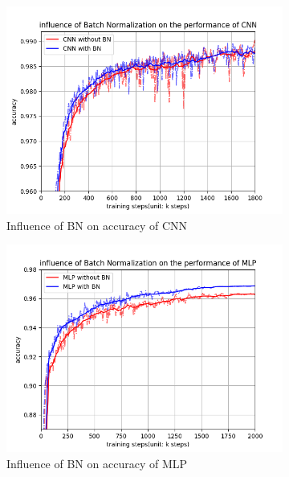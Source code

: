 \documentclass[12pt,letterpaper]{article}
\begin{document}
\begin{figure}[h]
    \begin{subfigure}{0.32\textwidth}
    \includegraphics[width=\linewidth]{CNN_BN_acc.png}
    \caption{\small Influence of BN on accuracy of CNN} \label{fig:a}
    \end{subfigure}\hspace*{\fill}
    \begin{subfigure}{0.32\textwidth}
    \includegraphics[width=\linewidth]{MLP_BN_acc.png}
    \caption{\small Influence of BN on accuracy of MLP} \label{fig:b}
    \end{subfigure}
    \begin{subfigure}{0.32\textwidth}

\end{subfigure}
\end{figure}
\end{document}
